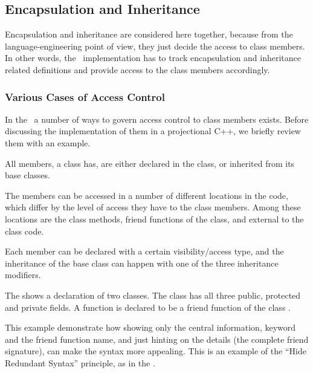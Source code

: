 \subsection{Encapsulation and Inheritance}


Encapsulation and inheritance are considered here together, because from the language-engineering point of view, 
they just decide the access to class members. In other words, the \pcpp\ implementation has to track
encapsulation and inheritance related definitions and provide access to the class members accordingly.


\subsubsection{Various Cases of Access Control}
\label{accessandfriends}

\cppproblem

In the \cpppl\ a number of ways to govern access control to class members exists. Before discussing 
the implementation of them in a projectional C++, we briefly review them with an example.

All members, a class has, are either declared in the class, or inherited from its base classes. 

The members can be accessed in a number of different locations in the code, which differ by the level of access they have
to the class members. Among these locations are the class methods, friend functions of the class, and
external to the class code. 

Each member can be declared with a certain visibility/access type, and the inheritance
of the base class can happen with one of the three inheritance modifiers. 



\pcppsolution


The  shows a declaration of two classes. The class  has all three
public, protected and private fields. A function  is declared to be a
friend function of  the class . 

This example demonstrate how showing only the central information,  keyword and the
friend function name, and just hinting on the details (the complete friend signature), can make 
the syntax more appealing. This is an example of the ``Hide Redundant Syntax'' principle, as in the .

